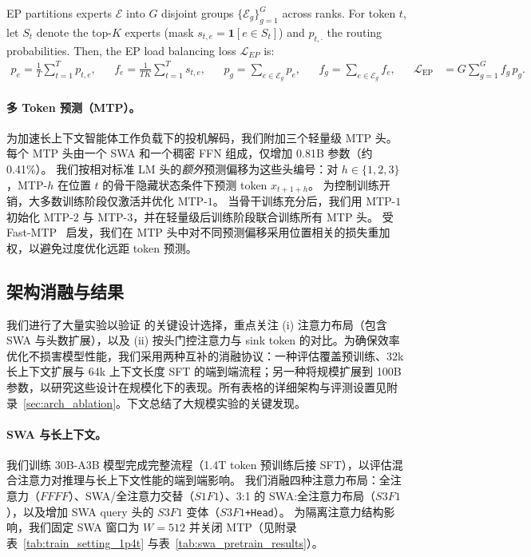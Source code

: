 \noindent
EP partitions experts $\mathcal{E}$ into $G$ disjoint groups $\{\mathcal{E}_g\}_{g=1}^{G}$ across ranks. For token $t$, let $S_t$ denote the top-$K$ experts (mask $s_{t,e}=\mathbf{1}[e\in S_t]$) and $p_{t,\cdot}$ the routing probabilities. Then, the EP load balancing loss $\mathcal{L}_{EP}$ is:
\begin{equation}
\begin{aligned}
p_e = \frac{1}{T}\sum_{t=1}^{T} p_{t,e}, & &
f_e = \frac{1}{TK}\sum_{t=1}^{T} s_{t,e}, & &
p_g = \sum_{e\in\mathcal{E}_g} p_e, & &
f_g = \sum_{e\in\mathcal{E}_g} f_e, & &
\mathcal{L}_{\mathrm{EP}} &= G\sum_{g=1}^{G} f_g\,p_g.
\end{aligned}
\end{equation}


\paragraph{多 Token 预测（MTP）。}
为加速长上下文智能体工作负载下的投机解码，我们附加三个轻量级 MTP 头。
每个 MTP 头由一个 SWA 和一个稠密 FFN 组成，仅增加 0.81B 参数（约 0.41\%）。
我们按相对标准 LM 头的\emph{额外}预测偏移为这些头编号：对 $h\in\{1,2,3\}$，MTP-$h$ 在位置 $t$ 的骨干隐藏状态条件下预测 token $x_{t+1+h}$。
为控制训练开销，大多数训练阶段仅激活并优化 MTP-$1$。
当骨干训练充分后，我们用 MTP-$1$ 初始化 MTP-$2$ 与 MTP-$3$，并在轻量级后训练阶段联合训练所有 MTP 头。
受 Fast-MTP~\cite{cai2025fastmtpacceleratingllminference} 启发，我们在 MTP 头中对不同预测偏移采用位置相关的损失重加权，以避免过度优化远距 token 预测。


\subsection{架构消融与结果}

我们进行了大量实验以验证 \ourmodel 的关键设计选择，重点关注 (i) 注意力布局（包含 SWA 与头数扩展），以及 (ii) 按头门控注意力与 sink token 的对比。为确保效率优化不损害模型性能，我们采用两种互补的消融协议：一种评估覆盖预训练、32k 长上下文扩展与 64k 上下文长度 SFT 的端到端流程；另一种将规模扩展到 100B 参数，以研究这些设计在规模化下的表现。所有表格的详细架构与评测设置见附录~\ref{sec:arch_ablation}。下文总结了大规模实验的关键发现。


\paragraph{SWA 与长上下文。}
\label{sec:swa_ratio_head_30b}
我们训练 30B-A3B 模型完成完整流程（1.4T token 预训练后接 SFT），以评估混合注意力对推理与长上下文性能的端到端影响。
我们消融四种注意力布局：全注意力（$FFFF$）、SWA/全注意力交替（$S1F1$）、3:1 的 SWA:全注意力布局（$S3F1$），以及增加 SWA query 头的 $S3F1$ 变体（\texttt{$S3F1$+Head}）。
为隔离注意力结构影响，我们固定 SWA 窗口为 $W{=}512$ 并关闭 MTP（见附录表~\ref{tab:train_setting_1p4t} 与表~\ref{tab:swa_pretrain_results}）。

